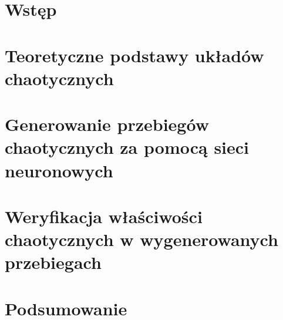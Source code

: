 \chapter{Wstęp}


\chapter{Teoretyczne podstawy układów chaotycznych}



%

\chapter{Generowanie przebiegów chaotycznych za pomocą sieci neuronowych}


\chapter{Weryfikacja właściwości chaotycznych w wygenerowanych przebiegach}


\chapter{Podsumowanie}
\label{ch:podsumowanie}

